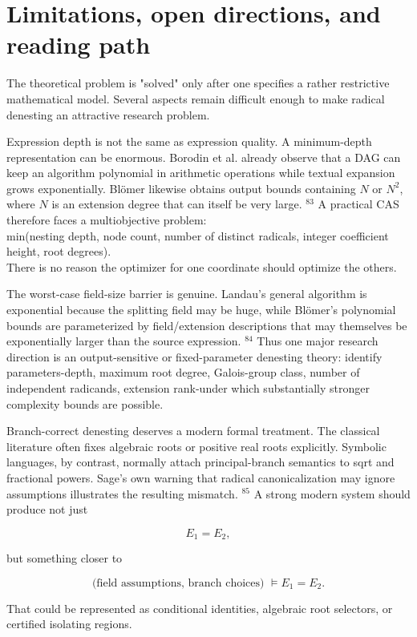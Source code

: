 \documentclass[10pt]{article}
\begin{document}
\section*{Limitations, open directions, and reading path}
The theoretical problem is "solved" only after one specifies a rather restrictive mathematical model. Several aspects remain difficult enough to make radical denesting an attractive research problem.

Expression depth is not the same as expression quality. A minimum-depth representation can be enormous. Borodin et al. already observe that a DAG can keep an algorithm polynomial in arithmetic operations while textual expansion grows exponentially. Blömer likewise obtains output bounds containing $N$ or $N^{2}$, where $N$ is an extension degree that can itself be very large. ${ }^{83}$ A practical CAS therefore faces a multiobjective problem:\\
min(nesting depth, node count, number of distinct radicals, integer coefficient height, root degrees).\\
There is no reason the optimizer for one coordinate should optimize the others.

The worst-case field-size barrier is genuine. Landau's general algorithm is exponential because the splitting field may be huge, while Blömer's polynomial bounds are parameterized by field/extension descriptions that may themselves be exponentially larger than the source expression. ${ }^{84}$ Thus one major research direction is an output-sensitive or fixed-parameter denesting theory: identify parameters-depth, maximum root degree, Galois-group class, number of independent radicands, extension rank-under which substantially stronger complexity bounds are possible.

Branch-correct denesting deserves a modern formal treatment. The classical literature often fixes algebraic roots or positive real roots explicitly. Symbolic languages, by contrast, normally attach principal-branch semantics to sqrt and fractional powers. Sage's own warning that radical canonicalization may ignore assumptions illustrates the resulting mismatch. ${ }^{85}$ A strong modern system should produce not just

$$
E_{1}=E_{2},
$$

but something closer to

$$
\text { (field assumptions, branch choices) } \models E_{1}=E_{2} \text {. }
$$

That could be represented as conditional identities, algebraic root selectors, or certified isolating regions.
\end{document}
